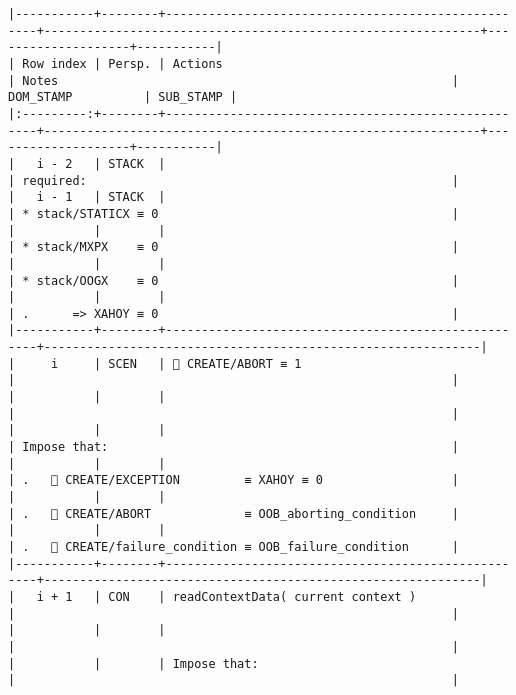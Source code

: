 \documentclass[varwidth=\maxdimen,margin=0.5cm,multi={verbatim}]{standalone}
\begin{document}
\begin{verbatim}
|-----------+--------+----------------------------------------------------+-------------------------------------------------------------+--------------------+-----------|
| Row index | Persp. | Actions                                            | Notes                                                       | DOM_STAMP          | SUB_STAMP |
|:---------:+--------+----------------------------------------------------+-------------------------------------------------------------+--------------------+-----------|
|   i - 2   | STACK  |                                                    | required:                                                   |
|   i - 1   | STACK  |                                                    | * stack/STATICX ≡ 0                                         |
|           |        |                                                    | * stack/MXPX    ≡ 0                                         |
|           |        |                                                    | * stack/OOGX    ≡ 0                                         |
|           |        |                                                    | .      => XAHOY ≡ 0                                         |
|-----------+--------+----------------------------------------------------+-------------------------------------------------------------|
|     i     | SCEN   |  CREATE/ABORT ≡ 1                                 |                                                             |
|           |        |                                                    |                                                             |
|           |        |                                                    | Impose that:                                                |
|           |        |                                                    | .    CREATE/EXCEPTION         ≡ XAHOY ≡ 0                  |
|           |        |                                                    | .    CREATE/ABORT             ≡ OOB_aborting_condition     |
|           |        |                                                    | .    CREATE/failure_condition ≡ OOB_failure_condition      |
|-----------+--------+----------------------------------------------------+-------------------------------------------------------------|
|   i + 1   | CON    | readContextData( current context )                 |                                                             |
|           |        |                                                    |                                                             |
|           |        | Impose that:                                       |                                                             |

\end{verbatim}
\end{document}
